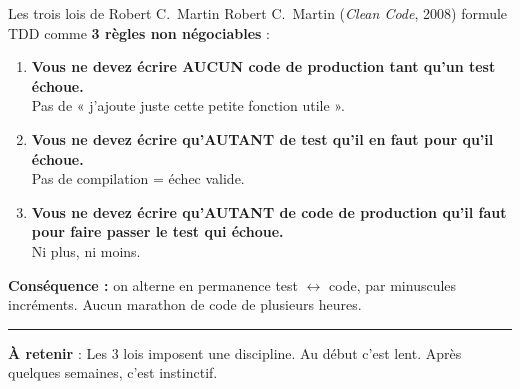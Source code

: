 \documentclass[aspectratio=169,11pt]{beamer}
\newcommand{\takeaway}[1]{%
\vfill\begin{beamercolorbox}[wd=\linewidth,sep=0.4em]{}
\color{accent2}\rule[0.6ex]{1.2em}{1.2pt}\hspace{0.4em}%
\textbf{\color{accent2}\small À retenir} \textcolor{textsoft}{:} %
{\small\color{textmain}#1}
\end{beamercolorbox}}
\begin{document}
\begin{frame}[t]{Les trois lois de Robert C.\ Martin}
\vspace{0.2cm}
\footnotesize
Robert C.\ Martin (\emph{Clean Code}, 2008) formule TDD comme \textbf{3 règles non négociables} :\\[0.5em]

\begin{enumerate}\itemsep0.4em
\item \textbf{Vous ne devez écrire AUCUN code de production tant qu'un test échoue.}\\
{\color{textsoft}\scriptsize Pas de « j'ajoute juste cette petite fonction utile ».}
\item \textbf{Vous ne devez écrire qu'AUTANT de test qu'il en faut pour qu'il échoue.}\\
{\color{textsoft}\scriptsize Pas de compilation =  échec valide.}
\item \textbf{Vous ne devez écrire qu'AUTANT de code de production qu'il faut pour faire passer le test qui échoue.}\\
{\color{textsoft}\scriptsize Ni plus, ni moins.}
\end{enumerate}
\vspace{0.5cm}
\textbf{Conséquence :} on alterne en permanence test $\leftrightarrow$ code, par minuscules incréments. Aucun \og marathon de code \fg{} de plusieurs heures.
\takeaway{Les 3 lois imposent une discipline. Au début c'est lent. Après quelques semaines, c'est instinctif.}
\end{frame}
\end{document}
